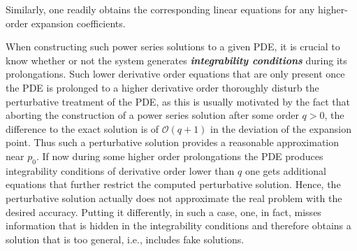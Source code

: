 \documentclass[%
preprint,
nofootinbib,
amsmath,amssymb,
aps,
prd,
floatfix,
]{revtex4-2}
\begin{document}
Similarly, one readily obtains the corresponding linear equations for any higher-order expansion coefficients. 

When constructing such power series solutions to a given PDE, it is crucial to know whether or not the system generates \textit{\textbf{integrability conditions}} during its prolongations. Such lower derivative order equations that are only present once the PDE is prolonged to a higher derivative order thoroughly disturb the perturbative treatment of the PDE, as this is usually motivated by the fact that aborting the construction of a power series solution
after some order $q>0$, the difference to the exact solution is of $\mathcal{O}(q+1)$ in the deviation of the expansion point. Thus such a perturbative solution provides a reasonable approximation near $p_0$. 
If now during some higher order prolongations the PDE produces integrability conditions of derivative order lower than $q$ one gets additional equations that further restrict the computed perturbative solution. 
Hence, the perturbative solution actually does not approximate the real problem with the desired accuracy. Putting it differently, in such a case, one, in fact, misses information that is hidden in the integrability conditions and therefore obtains a solution that is too general, i.e., includes fake solutions. 
\end{document}
